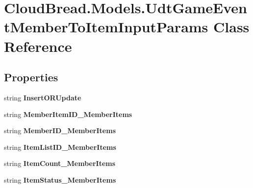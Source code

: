 \hypertarget{a00110}{}\section{Cloud\+Bread.\+Models.\+Udt\+Game\+Event\+Member\+To\+Item\+Input\+Params Class Reference}
\label{a00110}
\subsection*{Properties}
\begin{DoxyCompactItemize}
\item 
string {\bfseries Insert\+O\+R\+Update}\hypertarget{a00110_a91eac3149b99b746d0c8c924a9a7ac44}{}\label{a00110_a91eac3149b99b746d0c8c924a9a7ac44}

\item 
string {\bfseries Member\+Item\+I\+D\+\_\+\+Member\+Items}\hypertarget{a00110_af38edb6547029175e22096767a5a7c62}{}\label{a00110_af38edb6547029175e22096767a5a7c62}

\item 
string {\bfseries Member\+I\+D\+\_\+\+Member\+Items}\hypertarget{a00110_ad1dfc07e443bd0d4072e8f8f862d14f7}{}\label{a00110_ad1dfc07e443bd0d4072e8f8f862d14f7}

\item 
string {\bfseries Item\+List\+I\+D\+\_\+\+Member\+Items}\hypertarget{a00110_a0b63dd54514a24fee18bf51f765bca28}{}\label{a00110_a0b63dd54514a24fee18bf51f765bca28}

\item 
string {\bfseries Item\+Count\+\_\+\+Member\+Items}\hypertarget{a00110_a5af946cc0e44d67edeca40362e51b897}{}\label{a00110_a5af946cc0e44d67edeca40362e51b897}

\item 
string {\bfseries Item\+Status\+\_\+\+Member\+Items}\hypertarget{a00110_a90015ff4123da5cd4fbc17f53dc2f516}{}\label{a00110_a90015ff4123da5cd4fbc17f53dc2f516}


\end{DoxyCompactItemize}
